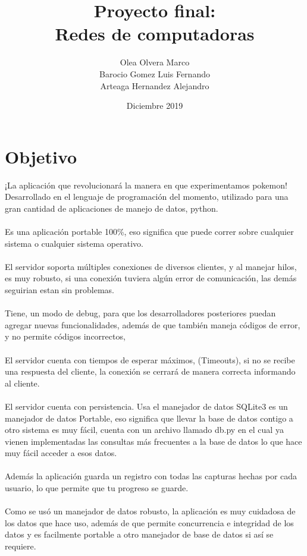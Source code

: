 \documentclass{report}
\title{Proyecto final:\\
Redes de computadoras}
\author{Olea Olvera Marco\\
Barocio Gomez Luis Fernando\\
Arteaga Hernandez Alejandro}
\date{Diciembre 2019}
\begin{document}
\maketitle

\section{Objetivo}
¡La aplicación que revolucionará la manera en que experimentamos pokemon!\\
Desarrollado en el lenguaje de programación del momento, utilizado para una gran cantidad de aplicaciones de manejo de datos, python.
\\\\
Es una aplicación portable 100\%, eso significa que puede correr sobre cualquier sistema o cualquier sistema operativo.
\\\\
El servidor soporta múltiples conexiones de diversos clientes, y al manejar hilos, es muy robusto, si una conexión tuviera algún error de comunicación, las demás seguirian estan sin problemas. 
\\\\
Tiene, un modo de debug, para que los desarrolladores posteriores puedan agregar nuevas funcionalidades, además de que también maneja códigos de error, y no permite códigos incorrectos, 
\\\\
El servidor cuenta con tiempos de esperar máximos, (Timeouts), si no se recibe una respuesta del cliente, la conexión se cerrará de manera correcta informando al cliente.
\\\\
El servidor cuenta con persistencia. Usa el manejador de datos SQLite3
es un manejador de datos Portable, eso significa que llevar la base de datos contigo a otro sistema es muy fácil, cuenta con un archivo llamado db.py en el cual ya vienen implementadas las consultas más frecuentes a la base de datos lo que hace muy fácil acceder a esos datos.\\\\
Además la aplicación guarda un registro con todas las capturas hechas por cada usuario, lo que permite que tu progreso se guarde. 
\\\\
Como se usó un manejador de datos robusto, la aplicación es muy cuidadosa de los datos que hace uso, además de que permite concurrencia e integridad de los datos y es facilmente portable a otro manejador de base de datos si así se requiere.\\\\
\end{document}
